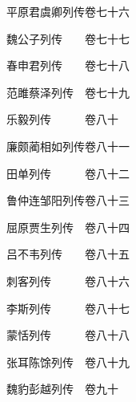 \par\hspace{3.5em}平原君虞卿列传\hspace{1.5em}卷七十六
\par\hspace{3.5em}魏公子列传　　\hspace{1.5em}卷七十七
\par\hspace{3.5em}春申君列传　　\hspace{1.5em}卷七十八
\par\hspace{3.5em}范雎蔡泽列传　\hspace{1.5em}卷七十九
\par\hspace{3.5em}乐毅列传　　　\hspace{1.5em}卷八十
\par\hspace{3.5em}廉颇蔺相如列传\hspace{1.5em}卷八十一
\par\hspace{3.5em}田单列传　　　\hspace{1.5em}卷八十二
\par\hspace{3.5em}鲁仲连邹阳列传\hspace{1.5em}卷八十三
\par\hspace{3.5em}屈原贾生列传　\hspace{1.5em}卷八十四
\par\hspace{3.5em}吕不韦列传　　\hspace{1.5em}卷八十五
\par\hspace{3.5em}刺客列传　　　\hspace{1.5em}卷八十六
\par\hspace{3.5em}李斯列传　　　\hspace{1.5em}卷八十七
\par\hspace{3.5em}蒙恬列传　　　\hspace{1.5em}卷八十八
\par\hspace{3.5em}张耳陈馀列传　\hspace{1.5em}卷八十九
\par\hspace{3.5em}魏豹彭越列传　\hspace{1.5em}卷九十
